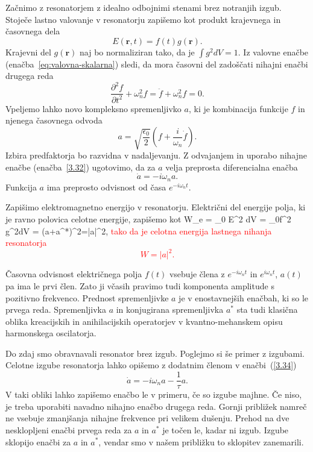 Začnimo z resonatorjem z idealno odbojnimi stenami brez notranjih izgub. Stoječe
lastno valovanje v resonatorju zapišemo kot produkt krajevnega in časovnega
dela
\begin{equation}
E(\mathbf{r},t)=f(t)g(\mathbf{r}).
\label{3.31}
\end{equation}
Krajevni del $g(\mathbf{r})$ naj bo normaliziran tako, da je $\int g^{2}dV=1$. Iz valovne
enačbe (enačba~\ref{eq:valovna-skalarna}) sledi, da mora časovni del zadoščati 
nihajni enačbi drugega reda
\begin{equation}
\frac{\partial^2 f}{\partial t^2}+\omega_{n}^{2}f= \ddot{f} + \omega_{n}^{2}f=0.
\label{3.32}
\end{equation}
Vpeljemo lahko novo kompleksno spremenljivko $a$, ki je kombinacija funkcije $f$ in njenega
časovnega odvoda
\begin{equation}
a=\sqrt{\frac{\epsilon_{0}}{2}}(f+\frac{i}{\omega_{n}}\dot{f}).
\label{3.33}
\end{equation}
Izbira predfaktorja bo razvidna v nadaljevanju. 
Z odvajanjem in uporabo nihajne enačbe (enačba~\ref{3.32}) ugotovimo, da za $a$ velja 
preprosta diferencialna enačba 
\begin{equation}
\dot{a}=-i\omega_{n}a.
\label{3.34}
\end{equation}
Funkcija $a$ ima preprosto odvisnost od časa $e^{-i\omega_{n}t}$. 

Zapišimo elektromagnetno energijo v resonatorju. Električni
del energije polja, ki je ravno polovica celotne energije, zapišemo kot
\beq
W_e = \varepsilon_0 \int E^2 dV = \epsilon_{0}f^{2}
\int g^{2}dV =  (a+a^{*})^2=|a|^{2},
\eeq
\textcolor{red}{tako da je celotna energija lastnega nihanja resonatorja 
\begin{equation}
W=|a|^{2}.
\label{3.35}
\end{equation}}

Časovna odvisnost električnega polja $f(t)$ vsebuje člena z $e^{-i\omega_{n}t}$
in $e^{i\omega_{n}t}$, $a(t)$ pa ima le prvi člen. Zato ji včasih pravimo
tudi komponenta amplitude s pozitivno frekvenco. Prednost spremenljivke
$a$ je v enostavnejših enačbah, ki so le prvega reda. Spremenljivka $a$ in 
konjugirana spremenljivka $a^{*}$ sta tudi klasična oblika kreacijskih
in anihilacijskih operatorjev v kvantno-mehanskem opisu harmonskega
oscilatorja.

Do zdaj smo obravnavali resonator brez izgub. Poglejmo si še primer z izgubami. 
Celotne izgube resonatorja lahko opišemo z dodatnim členom v enačbi~(\ref{3.34})
\begin{equation}
\dot{a}=-i\omega_{n}a-\frac{1}{\tau}a.
\label{3.36}
\end{equation}
V taki obliki lahko zapišemo enačbo le v primeru, če so izgube majhne. Če niso, 
je treba uporabiti navadno nihajno enačbo drugega reda. Gornji približek
namreč ne vsebuje zmanjšanja nihajne frekvence pri velikem dušenju.
Prehod na dve nesklopljeni enačbi prvega reda za $a$ in $a^*$
je točen le, kadar ni izgub. Izgube sklopijo enačbi za $a$ in $a^{\ast}$, 
vendar smo v našem približku to sklopitev zanemarili.

